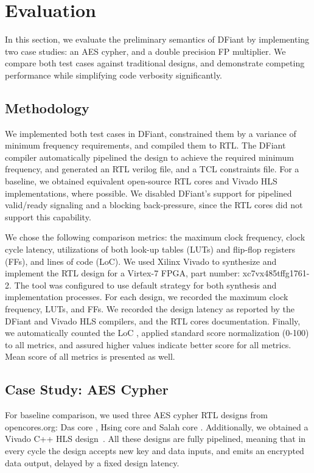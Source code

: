 \section{Evaluation}
\label{sec:evaluation}
In this section, we evaluate the preliminary semantics of DFiant by implementing two case studies: an AES cypher, and a double precision FP multiplier. We compare both test cases against traditional designs, and demonstrate competing performance while simplifying code verbosity significantly. 

\subsection{Methodology}
We implemented both test cases in DFiant, constrained them by a variance of minimum frequency requirements, and compiled them to RTL. The DFiant compiler automatically pipelined the design to achieve the required minimum frequency, and generated an RTL verilog file, and a TCL constraints file. For a baseline, we obtained equivalent open-source RTL cores and Vivado HLS implementations, where possible. We disabled DFiant's support for pipelined valid/ready signaling and a blocking back-pressure, since the RTL cores did not support this capability.

We chose the following comparison metrics: the maximum clock frequency, clock cycle latency, utilizations of both look-up tables (LUTs) and flip-flop registers (FFs), and lines of code (LoC). We used Xilinx Vivado to synthesize and implement the RTL design for a Virtex-7 FPGA, part number: xc7vx485tffg1761-2. The tool was configured to use default strategy for both synthesis and implementation processes. For each design, we recorded the maximum clock frequency, LUTs, and FFs. We recorded the design latency as reported by the DFiant and Vivado HLS compilers, and the RTL cores documentation. Finally, we automatically counted the LoC \cite{danial2009cloc}, applied standard score normalization (0-100) to all metrics, and assured higher values indicate better score for all metrics. Mean score of all metrics is presented as well.

\subsection{Case Study: AES Cypher}
For baseline comparison, we used three AES cypher RTL designs from opencores.org: Das core \cite{das2010fully}, Hsing core \cite{hsing2013aes} and Salah core \cite{salah2013aespipe}. Additionally, we obtained a Vivado C++ HLS design~\cite{oflynn2014rapid}. All these designs are fully pipelined, meaning that in every cycle the design accepts new key and data inputs, and emits an encrypted data output, delayed by a fixed design latency.

